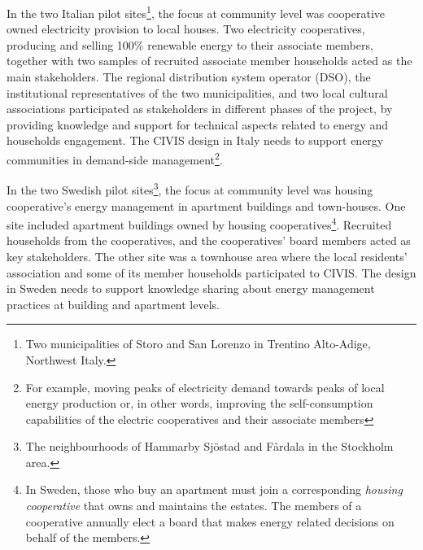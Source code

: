 In the two Italian pilot sites\footnote{Two municipalities of Storo and San Lorenzo in Trentino Alto-Adige, Northwest Italy.}, the focus at community level was cooperative owned electricity provision to local houses. 
Two electricity cooperatives, producing and 
selling 100\% renewable energy to their associate members, together with two samples of recruited 
associate member households acted as the main stakeholders.
The regional distribution system 
operator (DSO), the institutional representatives of the two municipalities, and two local cultural 
associations participated as stakeholders in different phases of the project, by providing knowledge 
and support for technical aspects related to energy and households engagement.
The CIVIS design in Italy needs to support energy communities in demand-side management\footnote{For example, moving peaks of electricity demand towards peaks of local energy
production or, in other words, improving the self-consumption capabilities of the electric cooperatives and
their associate members}. 

In the two Swedish pilot sites\footnote{The neighbourhoods of Hammarby Sj\"{o}stad and F\aa{}rdala in the Stockholm area.}, the focus at community level was housing cooperative's energy management in apartment buildings and town-houses.  
One site included apartment buildings owned by housing 
cooperatives\footnote{In Sweden, those who buy an apartment must join a corresponding \textit{housing cooperative} that owns and maintains the estates. The 
members of a cooperative annually elect a board that makes energy related decisions on behalf of 
the members.}. Recruited households from the cooperatives, and the cooperatives' board members acted
as key stakeholders. %
The other site was a townhouse area where the 
local residents' association and some of its member households participated to CIVIS.
The design in Sweden needs to support knowledge sharing about energy management practices at building and apartment levels.



